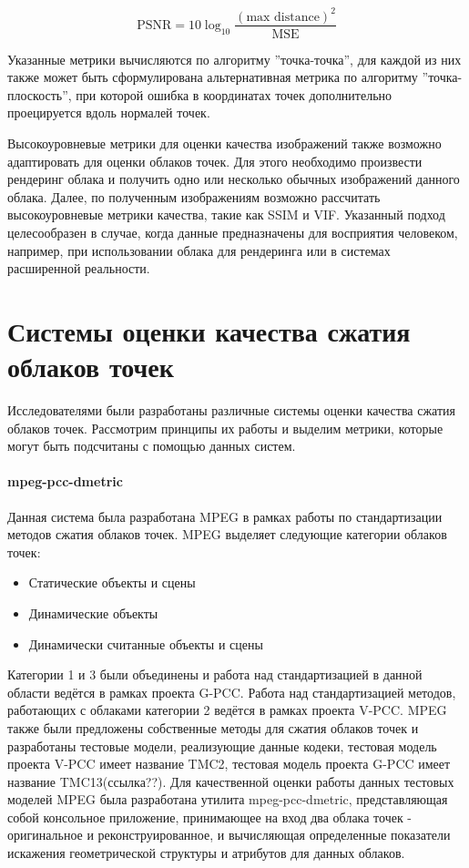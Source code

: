 \begin{equation} \label{eq:cloud_psnr}
    \text{PSNR} = 10\log_{10} \frac{\left(\text{max distance}\right)^{2}}{\text{MSE}}
\end{equation}

Указанные метрики вычисляются по алгоритму ''точка-точка'', для каждой из них
также может быть сформулирована альтернативная метрика по алгоритму
''точка-плоскость'', при которой ошибка в координатах точек дополнительно
проецируется вдоль нормалей точек.


Высокоуровневые метрики для оценки качества изображений также возможно
адаптировать для оценки облаков точек. Для этого необходимо произвести рендеринг
облака и получить одно или несколько обычных изображений данного облака. Далее,
по полученным изображениям возможно рассчитать высокоуровневые метрики качества,
такие как SSIM и VIF. Указанный подход целесообразен в случае, когда данные
предназначены для восприятия человеком, например, при использовании облака для
рендеринга или в системах расширенной реальности.

\section{Системы оценки качества сжатия облаков точек}

Исследователями были разработаны различные системы оценки качества сжатия
облаков точек. Рассмотрим принципы их работы и выделим метрики, которые могут
быть подсчитаны с помощью данных систем.

\paragraph{mpeg-pcc-dmetric}

Данная система была разработана MPEG в рамках работы по стандартизации методов
сжатия облаков точек. MPEG выделяет следующие категории облаков
точек\cite{CallForProposalV2}:

\begin{itemize}
    \item Статические объекты и сцены
    \item Динамические объекты
    \item Динамически считанные объекты и сцены
\end{itemize}


Категории 1 и 3 были объединены и работа над стандартизацией в данной области
ведётся в рамках проекта G-PCC. Работа над стандартизацией методов, работающих с
облаками категории 2 ведётся в рамках проекта V-PCC. MPEG также были предложены
собственные методы для сжатия облаков точек и разработаны тестовые модели,
реализующие данные кодеки, тестовая модель проекта V-PCC имеет название TMC2,
тестовая модель проекта G-PCC имеет название TMC13(ссылка??). Для качественной
оценки работы данных тестовых моделей MPEG была разработана утилита
mpeg-pcc-dmetric, представляющая собой консольное приложение, принимающее на
вход два облака точек - оригинальное и реконструированное, и вычисляющая
определенные показатели искажения геометрической структуры и атрибутов для
данных облаков.

